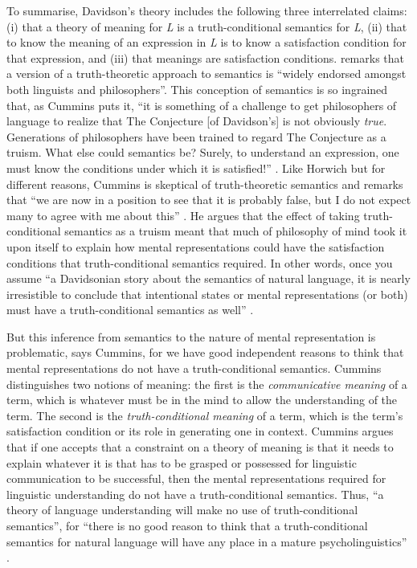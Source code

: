 To summarise, Davidson’s theory includes the following three interrelated claims: (i) that a theory of meaning for \textit{L} is a truth-conditional semantics for \textit{L}, (ii) that to know the meaning of an expression in \textit{L} is to know a satisfaction condition for that expression, and (iii) that meanings are satisfaction conditions. \citet[309]{Horwich2008} remarks that a version of a truth-theoretic approach to semantics is “widely endorsed amongst both linguists and philosophers”. This conception of semantics is so ingrained that, as Cummins puts it, “it is something of a challenge to get philosophers of language to realize that The Conjecture [of Davidson’s] is not obviously \textit{true}. Generations of philosophers have been trained to regard The Conjecture as a truism. What else could semantics be? Surely, to understand an expression, one must know the conditions under which it is satisfied!” \citep[153, emphasis in original]{Cummins2002}. Like Horwich but for different reasons, Cummins is skeptical of truth-theoretic semantics and remarks that “we are now in a position to see that it is probably false, but I do not expect many to agree with me about this” \citep[153]{Cummins2002}. He argues that the effect of taking truth-conditional semantics as a truism meant that much of philosophy of mind took it upon itself to explain how mental representations could have the satisfaction conditions that truth-conditional semantics required. In other words, once you assume “a Davidsonian story about the semantics of natural language, it is nearly irresistible to conclude that intentional states or mental representations (or both) must have a truth-conditional semantics as well” \citep[153]{Cummins2002}.

But this inference from semantics to the nature of mental representation is problematic, says Cummins, for we have good independent reasons to think that mental representations do not have a truth-conditional semantics. Cummins distinguishes two notions of meaning: the first is the \textit{communicative meaning} of a term, which is whatever must be in the mind to allow the understanding of the term. The second is the \textit{truth-conditional meaning} of a term, which is the term’s satisfaction condition or its role in generating one in context. Cummins argues that if one accepts that a constraint on a theory of meaning is that it needs to explain whatever it is that has to be grasped or possessed for linguistic communication to be successful, then the mental representations required for linguistic understanding do not have a truth-conditional semantics. Thus, “a theory of language understanding will make no use of truth-conditional semantics”, for “there is no good reason to think that a truth-conditional semantics for natural language will have any place in a mature psycholinguistics” \citep[155]{Cummins2002}.

